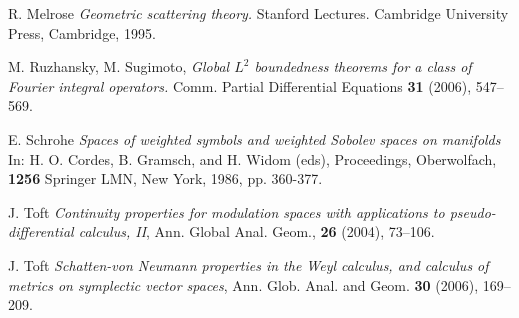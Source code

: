 \documentclass[12pt,a4paper,reqno]{amsart}
\numberwithin{equation}{section}
\numberwithin{thm}{section}
\theoremstyle{definition}
\theoremstyle{remark}
\begin{document}
\begin{thebibliography}{150}
 R. Melrose \emph{Geometric scattering theory.} Stanford Lectures.
Cambridge University Press, Cambridge, 1995.

 M. Ruzhansky, M. Sugimoto,  
      \emph{Global $L^2$ boundedness 
      theorems for a class of Fourier integral operators.} 
      Comm. Partial Differential Equations
      \textbf{31} (2006), 547--569. 

 E. Schrohe \emph{Spaces of weighted symbols and
weighted Sobolev spaces on manifolds} In: H. O. Cordes,
B. Gramsch, and H. Widom (eds), Proceedings, Oberwolfach,
\textbf{1256} Springer LMN, New York, 1986, pp. 360-377.

 J. Toft \emph{Continuity
properties for modulation spaces with applications to
pseudo-differential calculus, II}, {Ann. Global Anal. Geom.},
\textbf{26} (2004), 73--106.

 J. Toft \emph{Schatten-von Neumann properties in the
Weyl calculus, and calculus of metrics on symplectic vector spaces},
Ann. Glob. Anal. and Geom. \textbf{30} (2006), 169--209.

\end{thebibliography}
\end{document}
